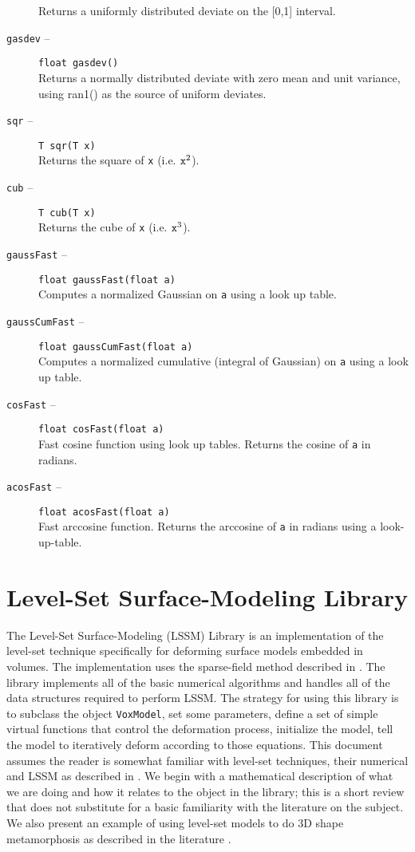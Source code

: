 \begin{description}
Returns a uniformly distributed deviate on the [0,1] interval.
\item[{\tt gasdev} --]
{\tt float gasdev()}\\
Returns a normally distributed deviate with zero mean and unit variance, 
using ran1() as the source of uniform deviates.
\item[{\tt sqr} --]
{\tt T sqr(T x)}\\
Returns the square of {\tt x} (i.e. ${\tt x}^2$).
\item[{\tt cub} --]
{\tt T cub(T x)}\\
Returns the cube of {\tt x} (i.e. ${\tt x}^3$).
\item[{\tt gaussFast} --]
{\tt float gaussFast(float a)}\\
Computes a normalized Gaussian on {\tt a} using a look up table.
\item[{\tt gaussCumFast} --]
{\tt float gaussCumFast(float a)}\\
Computes a normalized cumulative (integral of Gaussian)
on {\tt a} using a look up table.
\item[{\tt cosFast} --]
{\tt float cosFast(float a)}\\
Fast cosine function using look up tables.  
Returns the cosine of {\tt a} in radians.
\item[{\tt acosFast} --]
{\tt float acosFast(float a)}\\
Fast arccosine function.  Returns the arccosine of {\tt a} in 
radians using a look-up-table.
\end{description}

\section{Level-Set Surface-Modeling Library}
\label{voxref}
The Level-Set Surface-Modeling (LSSM) Library is an implementation of
the level-set technique \cite{osh88,set96} specifically for deforming
surface models embedded in volumes.  The implementation uses the
sparse-field method described in \cite{whi98}.  The library implements
all of the basic numerical algorithms and handles all of the data
structures required to perform LSSM.  The strategy for using this
library is to subclass the object {\tt VoxModel}, set some parameters,
define a set of simple virtual functions that control the deformation
process, initialize the model, tell the model to iteratively deform
according to those equations.  This document assumes the reader is
somewhat familiar with level-set techniques, their numerical and LSSM
as described in \cite{whi98b}.  We begin with a mathematical
description of what we are doing and how it relates to the object in
the library; this is a short review that does not substitute for a
basic familiarity with the literature on the subject.
We also present an example of using level-set models to
do 3D shape metamorphosis as described in the literature
\cite{whi98,bre01}.

